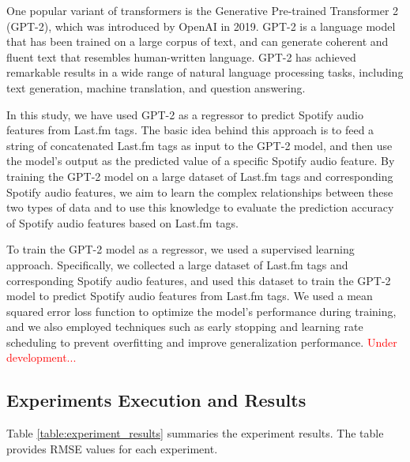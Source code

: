 \documentclass[sn-mathphys]{sn-jnl}%
\theoremstyle{thmstyleone}%
\theoremstyle{thmstyletwo}%
\theoremstyle{thmstylethree}%
\begin{document}
One popular variant of transformers is the Generative Pre-trained Transformer 2 (GPT-2),
which was introduced by OpenAI in 2019.
GPT-2 is a language model that has been trained on a large corpus of text,
and can generate coherent and fluent text that resembles human-written language.
GPT-2 has achieved remarkable results in a wide range of natural language processing tasks, including text generation, machine translation, and question answering.

In this study, we have used GPT-2 as a regressor to predict Spotify audio features from Last.fm tags. The basic idea behind this approach is to feed a string of concatenated Last.fm tags as input to the GPT-2 model, and then use the model's output as the predicted value of a specific Spotify audio feature. By training the GPT-2 model on a large dataset of Last.fm tags and corresponding Spotify audio features,
we aim to learn the complex relationships between these two types of data and to use this knowledge to evaluate the prediction accuracy of Spotify audio features based on Last.fm tags.

To train the GPT-2 model as a regressor, we used a supervised learning approach.
Specifically, we collected a large dataset of Last.fm tags and corresponding Spotify audio features, and used this dataset to train the GPT-2 model to predict Spotify audio features from Last.fm tags. We used a mean squared error loss function to optimize the model's performance during training, and we also employed techniques such as early stopping and learning rate scheduling to prevent overfitting and improve generalization performance.
\textcolor{red}{Under development...}

\subsection{Experiments Execution and Results}

Table \ref{table:experiment_results} summaries the experiment results.
The table provides RMSE values for each experiment.



\end{document}
